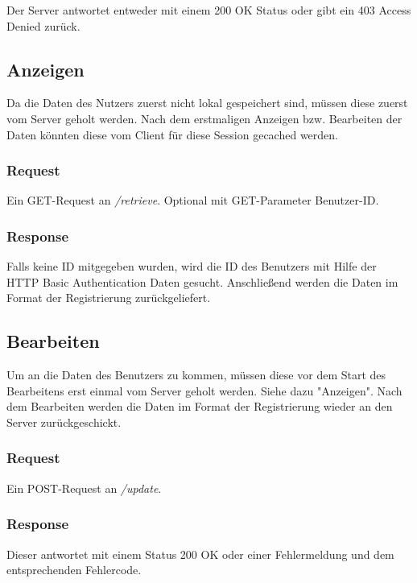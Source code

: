 \documentclass[ngerman,titlepage]{scrartcl}
\begin{document}
		Der Server antwortet entweder mit einem 200 OK Status oder gibt ein 403 Access Denied zurück.
		
	\subsection{Anzeigen}
	
	Da die Daten des Nutzers zuerst nicht lokal gespeichert sind, müssen diese zuerst vom Server geholt werden. Nach dem erstmaligen Anzeigen bzw. Bearbeiten der Daten könnten diese vom Client für diese Session gecached werden.
	
		\subsubsection*{Request}
		
		Ein GET-Request an \textit{/retrieve}. Optional mit GET-Parameter Benutzer-ID.
		
		\subsubsection*{Response}
		
		Falls keine ID mitgegeben wurden, wird die ID des Benutzers mit Hilfe der HTTP Basic Authentication Daten gesucht. Anschließend werden die Daten im Format der Registrierung zurückgeliefert.
		
	\subsection{Bearbeiten}

	Um an die Daten des Benutzers zu kommen, müssen diese vor dem Start des Bearbeitens erst einmal vom Server geholt werden. Siehe dazu "Anzeigen". Nach dem Bearbeiten werden die Daten im Format der Registrierung wieder an den Server zurückgeschickt.
	
	\subsubsection*{Request}
		
		Ein POST-Request an \textit{/update}.
	
	\subsubsection*{Response}
	Dieser antwortet mit einem Status 200 OK oder einer Fehlermeldung und dem entsprechenden Fehlercode.
	
\end{document}
